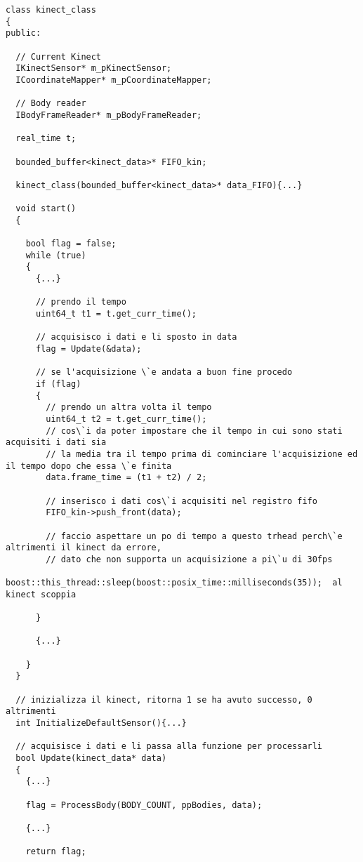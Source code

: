 \documentclass[10pt,a4paper]{article}
\begin{document}
\begin{lstlisting}[style=mycpp, caption=librerie usate, captionpos=b]
class kinect_class
{
public:

  // Current Kinect
  IKinectSensor* m_pKinectSensor;
  ICoordinateMapper* m_pCoordinateMapper;

  // Body reader
  IBodyFrameReader* m_pBodyFrameReader;

  real_time t;

  bounded_buffer<kinect_data>* FIFO_kin;

  kinect_class(bounded_buffer<kinect_data>* data_FIFO){...}

  void start()
  {
    
    bool flag = false;
    while (true)
    {
      {...}
      
      // prendo il tempo
      uint64_t t1 = t.get_curr_time();  
      
      // acquisisco i dati e li sposto in data
      flag = Update(&data);

      // se l'acquisizione \`e andata a buon fine procedo
      if (flag)
      {
        // prendo un altra volta il tempo
        uint64_t t2 = t.get_curr_time();
        // cos\`i da poter impostare che il tempo in cui sono stati acquisiti i dati sia 
        // la media tra il tempo prima di cominciare l'acquisizione ed il tempo dopo che essa \`e finita
        data.frame_time = (t1 + t2) / 2;

        // inserisco i dati cos\`i acquisiti nel registro fifo
        FIFO_kin->push_front(data);
        
        // faccio aspettare un po di tempo a questo trhead perch\`e altrimenti il kinect da errore, 
        // dato che non supporta un acquisizione a pi\`u di 30fps
        boost::this_thread::sleep(boost::posix_time::milliseconds(35));  al kinect scoppia

      }

      {...}

    }
  }

  // inizializza il kinect, ritorna 1 se ha avuto successo, 0 altrimenti
  int InitializeDefaultSensor(){...}

  // acquisisce i dati e li passa alla funzione per processarli
  bool Update(kinect_data* data)
  {
    {...}
    
    flag = ProcessBody(BODY_COUNT, ppBodies, data);
    
    {...}
    
    return flag;
    

\end{lstlisting}
\end{document}
